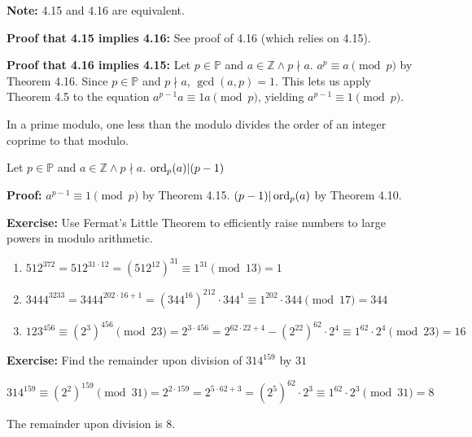 \item \textbf{Note:} 4.15 and 4.16 are equivalent.

\textbf{Proof that 4.15 implies 4.16:} See proof of 4.16 (which relies on 4.15).

\textbf{Proof that 4.16 implies 4.15:} Let \(p \in \mathbb P\) and \(a \in \mathbb Z \wedge p \nmid a\). \(a^p \equiv a \pmod p\) by Theorem 4.16. Since \(p \in \mathbb P\) and \(p \nmid a\), \(\gcd(a, p) = 1\). This lets us apply Theorem 4.5 to the equation \(a^{p-1} a \equiv 1 a \pmod p\), yielding \(a^{p-1} \equiv 1 \pmod p\).

\item In a prime modulo, one less than the modulo divides the order of an integer coprime to that modulo.

Let \(p \in \mathbb P\) and \(a \in \mathbb Z \wedge p \nmid a\). \(\operatorname{ord}_p(a) | (p-1)\)

\textbf{Proof:} \(a^{p-1} \equiv 1 \pmod p\) by Theorem 4.15. \((p-1)|\operatorname{ord}_p(a)\) by Theorem 4.10.

\item \textbf{Exercise:} Use Fermat's Little Theorem to efficiently raise numbers to large powers in modulo arithmetic.

\begin{enumerate}
\item \(512^{372} = 512^{31 \cdot 12} = (512^{12})^{31} \equiv 1^{31} \pmod{13} = 1\)
\item \(3444^{3233} = 3444^{202 \cdot 16 + 1} = (344^{16})^{212} \cdot 344^1 \equiv 1^{202} \cdot 344 \pmod{17} = 344\)
\item \(123^{456} \equiv (2^3)^{456} \pmod{23} = 2^{3 \cdot 456} = 2^{62 \cdot 22 + 4} - (2^{22})^{62} \cdot 2^4 \equiv 1^62 \cdot 2^4 \pmod{23} = 16\)
\end{enumerate}

\item \textbf{Exercise:} Find the remainder upon division of \(314^{159}\) by \(31\)

\(314^{159} \equiv (2^2)^{159} \pmod {31} = 2^{2 \cdot 159} = 2^{5 \cdot 62 + 3} = (2^5)^{62} \cdot 2^3 \equiv 1^62 \cdot 2^3 \pmod {31} = 8\)

The remainder upon division is 8.

